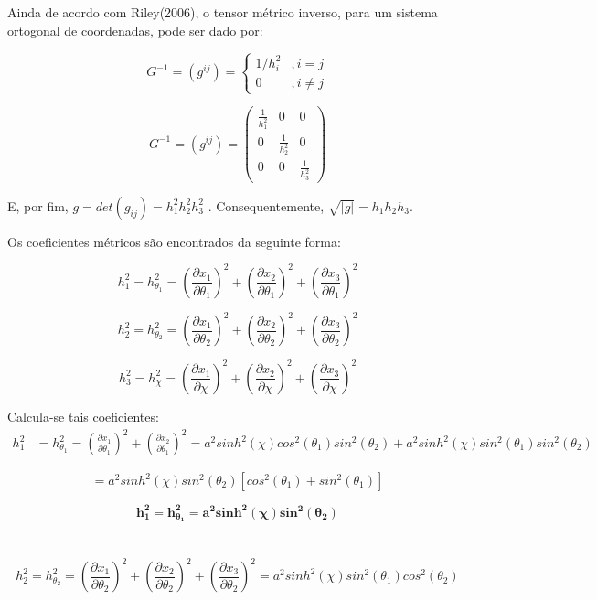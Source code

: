 \documentclass[12pt, a4papper]{article}
\begin{document}
Ainda de acordo com Riley(2006), o tensor métrico inverso, para um
sistema ortogonal de coordenadas, pode ser dado por:

\[
G^{-1}=(g^{ij})=\begin{cases}
1/h_{i}^{2} & ,i=j\\
0 & ,i\neq j
\end{cases}
\]

\[
G^{-1}=(g^{ij})=\left(\begin{array}{ccc}
\frac{1}{h_{1}^{2}} & 0 & 0\\
0 & \frac{1}{h_{2}^{2}} & 0\\
0 & 0 & \frac{1}{h_{3}^{2}}
\end{array}\right)
\]

E, por fim, $g=det(g_{ij})=h_{1}^{2}h_{2}^{2}h_{3}^{2}$ . Consequentemente,
$\sqrt{|g|}=h_{1}h_{2}h_{3}$.

Os coeficientes métricos são encontrados da seguinte forma:

\[
h_{1}^{2}=h_{\theta_{1}}^{2}=\left(\frac{\partial x_{1}}{\partial\theta_{1}}\right)^{2}+\left(\frac{\partial x_{2}}{\partial\theta_{1}}\right)^{2}+\left(\frac{\partial x_{3}}{\partial\theta_{1}}\right)^{2}
\]

\[
h_{2}^{2}=h_{\theta_{2}}^{2}=\left(\frac{\partial x_{1}}{\partial\theta_{2}}\right)^{2}+\left(\frac{\partial x_{2}}{\partial\theta_{2}}\right)^{2}+\left(\frac{\partial x_{3}}{\partial\theta_{2}}\right)^{2}
\]

\[
h_{3}^{2}=h_{\chi}^{2}=\left(\frac{\partial x_{1}}{\partial\chi}\right)^{2}+\left(\frac{\partial x_{2}}{\partial\chi}\right)^{2}+\left(\frac{\partial x_{3}}{\partial\chi}\right)^{2}
\]

Calcula-se tais coeficientes:
\begin{align*}
h_{1}^{2} & =h_{\theta_{1}}^{2}=\left(\frac{\partial x_{1}}{\partial\theta_{1}}\right)^{2}+\left(\frac{\partial x_{2}}{\partial\theta_{1}}\right)^{2}=a^{2}sinh^{2}(\chi)cos^{2}(\theta_{1})sin^{2}(\theta_{2})+a^{2}sinh^{2}(\chi)sin^{2}(\theta_{1})sin^{2}(\theta_{2})
\end{align*}

\[
=a{{}^2}sinh^{2}(\chi)sin^{2}(\theta_{2})\left[cos^{2}(\theta_{1})+sin^{2}(\theta_{1})\right]
\]

\[
\boldsymbol{h_{1}^{2}=h_{\theta_{1}}^{2}=a^{2}sinh^{2}(\chi)sin^{2}(\theta_{2})}
\]
\\
\\
\[
h_{2}^{2}=h_{\theta_{2}}^{2}=\left(\frac{\partial x_{1}}{\partial\theta_{2}}\right)^{2}+\left(\frac{\partial x_{2}}{\partial\theta_{2}}\right)^{2}+\left(\frac{\partial x_{3}}{\partial\theta_{2}}\right)^{2}=a^{2}sinh^{2}(\chi)sin^{2}(\theta_{1})cos^{2}(\theta_{2})
\]
\end{document}
